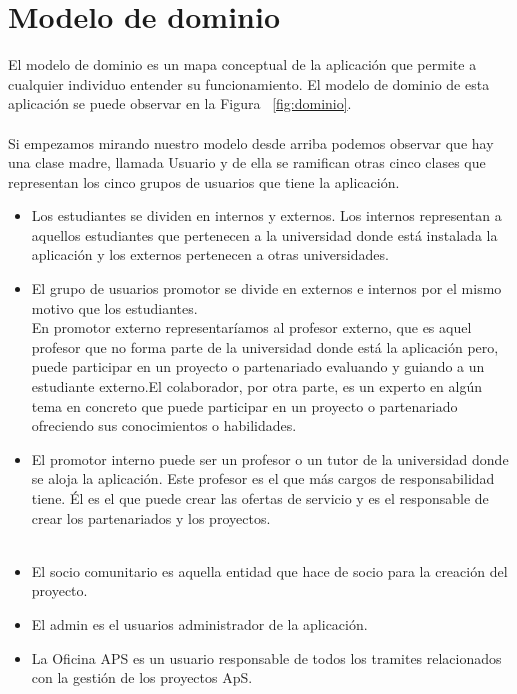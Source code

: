 \documentclass[11pt]{book}
\begin{document}
\section{Modelo de dominio}
El modelo de dominio es un mapa conceptual de la aplicación que permite a cualquier individuo entender su funcionamiento. El modelo de dominio de esta aplicación se puede observar en la Figura ~\ref{fig:dominio}.\\\\
Si empezamos mirando nuestro modelo desde arriba podemos observar que hay una clase madre, llamada Usuario y de ella se ramifican otras cinco clases que representan los cinco grupos de usuarios que tiene la aplicación.\\
\begin{itemize} 
	\item Los estudiantes se dividen en internos y externos. Los internos representan a aquellos estudiantes que pertenecen a la universidad donde está instalada la aplicación y los externos pertenecen a otras universidades.\\
	\item El grupo de usuarios promotor se divide en externos e internos por el mismo motivo que los estudiantes. \\
	En promotor externo representaríamos al profesor externo, que es aquel profesor que no forma parte de la universidad donde está la aplicación pero, puede participar en un proyecto o partenariado evaluando y guiando a un estudiante externo.El colaborador, por otra parte, es un experto en algún tema en concreto que puede participar en un proyecto o partenariado ofreciendo sus conocimientos o habilidades.\\
	\item El promotor interno puede ser un profesor o un tutor de la universidad donde se aloja la aplicación. Este profesor es el que más cargos de responsabilidad tiene. Él es el que puede crear las ofertas de servicio y es el responsable de crear los partenariados y los proyectos.\\\\
	\item El socio comunitario es aquella entidad que hace de socio para la creación del proyecto.
	\item El admin es el usuarios administrador de la aplicación.
	\item La Oficina APS es un usuario responsable de todos los tramites relacionados con la gestión de los proyectos ApS. 
\end{itemize}
\end{document}
